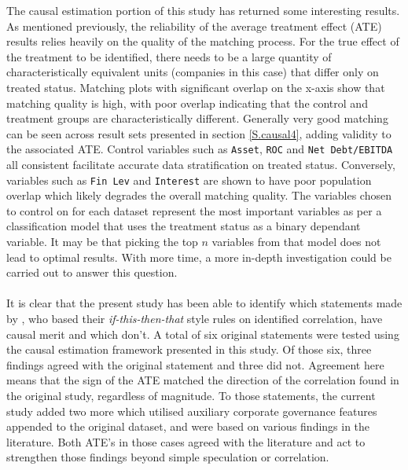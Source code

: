 {The causal estimation portion of this study has returned some interesting results. As mentioned previously, the reliability of the average treatment effect (ATE) results relies heavily on the quality of the matching process. For the true effect of the treatment to be identified, there needs to be a large quantity of characteristically equivalent units (companies in this case) that differ only on treated status. Matching plots with significant overlap on the x-axis show that matching quality is high, with poor overlap indicating that the control and treatment groups are characteristically different. Generally very good matching can be seen across result sets presented in section \ref{S.causal4}, adding validity to the associated ATE. Control variables such as \texttt{Asset}, \texttt{ROC} and \texttt{Net Debt/EBITDA} all consistent facilitate accurate data stratification on treated status. Conversely, variables such as \texttt{Fin Lev} and \texttt{Interest} are shown to have poor population overlap which likely degrades the overall matching quality. The variables chosen to control on for each dataset represent the most important variables as per a classification model that uses the treatment status as a binary dependant variable. It may be that picking the top $n$ variables from that model does not lead to optimal results. With more time, a more in-depth investigation could be carried out to answer this question. \\\\
It is clear that the present study has been able to identify which statements made by \cite{moldovan2015learning}, who based their {\it if-this-then-that} style rules on identified correlation, have causal merit and which don't. A total of six original statements were tested using the causal estimation framework presented in this study. Of those six, three findings agreed with the original statement and three did not. Agreement here means that the sign of the ATE matched the direction of the correlation found in the original study, regardless of magnitude. To those statements, the current study added two more which utilised auxiliary corporate governance features appended to the original dataset, and were based on various findings in the literature. Both ATE's in those cases agreed with the literature and act to strengthen those findings beyond simple speculation or correlation.   }

